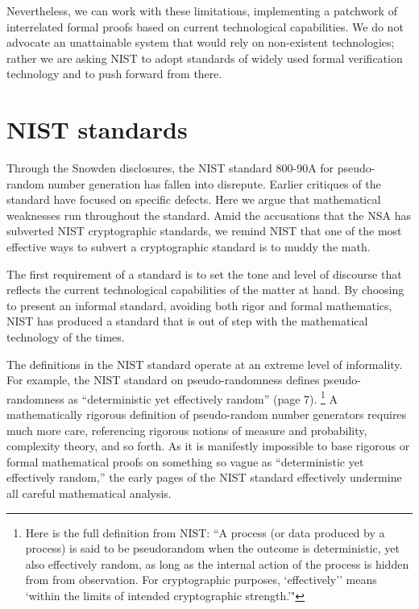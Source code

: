 \documentclass[11pt]{amsart} %
\begin{document}
Nevertheless, we can work with these limitations, implementing a patchwork of interrelated formal proofs
based on current technological capabilities.  We do not advocate an unattainable system
that would rely on non-existent technologies; rather we are asking NIST
to adopt standards of widely used formal verification technology and to push forward from there.


\section{NIST standards}

Through the Snowden disclosures, the NIST standard 800-90A for pseudo-random number
generation has fallen into disrepute.  Earlier critiques of the standard have focused on specific
defects.  Here we argue that 
mathematical weaknesses run throughout the standard.  Amid the accusations that the NSA has subverted NIST
cryptographic standards, we remind NIST that one of the most effective ways to subvert a cryptographic standard is to 
muddy the math.

The first requirement of a standard is to set the tone and level of discourse that reflects the current
technological capabilities of the matter at hand.  By choosing to present an informal standard, 
avoiding both rigor and formal mathematics,
NIST has produced a standard that is out of step with the mathematical technology of the times.

The definitions in the NIST standard 
operate at an extreme level of informality.
For example,  the NIST standard on pseudo-randomness defines pseudo-randomness as ``deterministic yet effectively random'' (page 7).%
\footnote{Here is the full definition from NIST: 
``A process (or data produced by a process) is said to be pseudorandom when the
outcome is deterministic, yet also effectively random, as long as the internal action of the process
is hidden from from observation.  For cryptographic purposes, `effectively'' means `within the limits
of intended cryptographic strength.'"}
A mathematically rigorous definition of pseudo-random number generators
requires much more care, referencing rigorous notions of measure and probability,
complexity theory, and so forth.  As it is manifestly impossible to base rigorous or formal mathematical proofs
on something so vague as ``deterministic yet effectively random,'' the early pages of the NIST standard 
effectively undermine all careful mathematical analysis.
\end{document}
